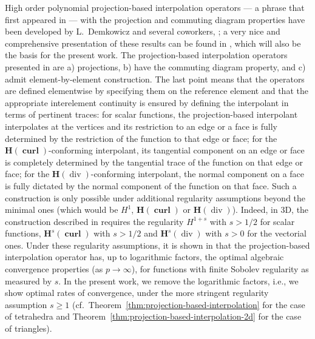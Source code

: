 \documentclass{article}
\begin{document}
High order polynomial projection-based interpolation operators --- a phrase that first appeared in \cite[Sec.~{3}]{hiptmair-acta} --- with the projection 
and commuting diagram properties have been developed by L.~Demkowicz and several coworkers,  
\cite{demkowicz-babuska03,demkowicz-buffa05,demkowicz-cao05,demkowicz-monk-vardapetyan-rachowicz00};
a very nice and comprehensive presentation of these results can be found in \cite{demkowicz08}, which will also 
be the basis for the present work. 
The projection-based interpolation operators presented in \cite{demkowicz08} are a) projections, b) have the commuting diagram
property, and c) admit element-by-element construction. The last point means that 
the operators are defined elementwise by specifying them on the reference element and that the appropriate
interelement continuity is ensured by defining the interpolant in terms of pertinent traces: 
for scalar functions, the projection-based interpolant interpolates at the vertices and its restriction to 
an edge or a face is fully  determined by the restriction of the function to that edge or face; 
for the ${\mathbf H}(\operatorname{\mathbf{curl}})$-conforming interpolant, its tangential component on an edge or face 
is completely determined by the tangential trace of the function on that edge or face; 
for the ${\mathbf H}(\operatorname{div})$-conforming interpolant, 
the normal component on a face is fully dictated by the normal component of the function on that face. 
Such a construction is only possible under additional regularity assumptions beyond the minimal ones
(which would be $H^1$, ${\mathbf H}(\operatorname{\mathbf{curl}})$ 
or ${\mathbf H}(\operatorname{div})$). Indeed, in 3D, the 
construction described in \cite{demkowicz08} requires the regularity $H^{1+s}$ with $s > 1/2$ for scalar functions, 
${\mathbf H}^s(\operatorname{\mathbf{curl}})$ with $s > 1/2$ 
and ${\mathbf H}^s(\operatorname{div})$ with $s > 0$ for the vectorial ones. 
Under these regularity assumptions, it is shown in \cite[Thm.~{5.3}]{demkowicz08} that the projection-based
interpolation operator has, up to logarithmic factors, the optimal algebraic convergence properties 
(as $p \rightarrow \infty$), for functions with finite Sobolev regularity as measured by $s$. 
In the present work, we remove the logarithmic
factors, i.e., we show optimal rates of convergence, under the more stringent regularity assumption $s \ge 1$
(cf.~Theorem~\ref{thm:projection-based-interpolation} for the case of tetrahedra and Theorem~\ref{thm:projection-based-interpolation-2d} for the case of triangles). 
\end{document}
